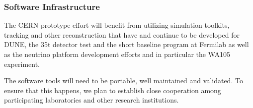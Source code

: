 \subsubsection{Software Infrastructure}

The CERN prototype effort will benefit from utilizing simulation toolkits, tracking and other reconstruction
that have and continue to be developed for DUNE, the 35t detector test and the short baseline program at Fermilab as well as the 
neutrino platform development efforts and in particular the WA105 experiment.

The software tools will need to be portable, well maintained and validated. To ensure that this happens,
we plan to establish close cooperation among participating laboratories and other research institutions.



%

